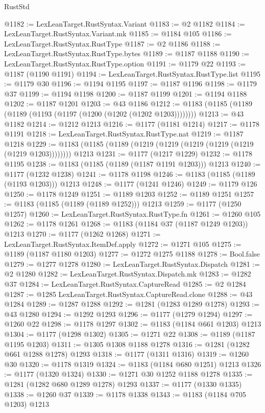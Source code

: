 \begin{lexlean}{RustStd}
\begin{coremodule}
@1182 := LexLeanTarget.RustSyntax.Variant
@1183 := @2 @1182
@1184 := LexLeanTarget.RustSyntax.Variant.mk
@1185 := @1184 @105
@1186 := LexLeanTarget.RustSyntax.RustType
@1187 := @2 @1186
@1188 := LexLeanTarget.RustSyntax.RustType.bytes
@1189 := @1187 @1188
@1190 := LexLeanTarget.RustSyntax.RustType.option
@1191 := @1179 @22
@1193 := @1187 (@1190 @1191)
@1194 := LexLeanTarget.RustSyntax.RustType.list
@1195 := @1179 @30
@1196 := @1194 @1195
@1197 := @1187 @1196
@1198 := @1179 @37
@1199 := @1194 @1198
@1200 := @1187 @1199
@1201 := @1194 @1188
@1202 := @1187 @1201
@1203 := @43 @1186
@1212 := @1183 (@1185 (@1189 (@1189 (@1193 (@1197 (@1200 (@1202 (@1202 @1203))))))))
@1213 := @43 @1182
@1214 := @1212 @1213
@1216 := @1177 (@1181 @1214)
@1217 := @1178 @1191
@1218 := LexLeanTarget.RustSyntax.RustType.nat
@1219 := @1187 @1218
@1229 := @1183 (@1185 (@1189 (@1219 (@1219 (@1219 (@1219 (@1219 (@1219 @1203)))))))) @1213
@1231 := @1177 (@1217 @1229)
@1232 := @1178 @1195
@1238 := @1183 (@1185 (@1189 (@1187 @1191 @1203))) @1213
@1240 := @1177 (@1232 @1238)
@1241 := @1178 @1198
@1246 := @1183 (@1185 (@1189 (@1193 @1203))) @1213
@1248 := @1177 (@1241 @1246)
@1249 := @1179 @126
@1250 := @1178 @1249
@1251 := @1189 @1203
@1252 := @1189 @1251
@1257 := @1183 (@1185 (@1189 (@1189 @1252))) @1213
@1259 := @1177 (@1250 @1257)
@1260 := LexLeanTarget.RustSyntax.RustType.fn
@1261 := @1260 @105
@1262 := @1178 @1261
@1268 := @1183 (@1184 @37 (@1187 @1249 @1203)) @1213
@1270 := @1177 (@1262 @1268)
@1271 := LexLeanTarget.RustSyntax.ItemDef.apply
@1272 := @1271 @105
@1275 := @1189 (@1187 @1180 @1203)
@1277 := @1272 @1275 @1188
@1278 := Bool.false
@1279 := @1277 @1278
@1280 := LexLeanTarget.RustSyntax.Dispatch
@1281 := @2 @1280
@1282 := LexLeanTarget.RustSyntax.Dispatch.mk
@1283 := @1282 @37
@1284 := LexLeanTarget.RustSyntax.CaptureRead
@1285 := @2 @1284
@1287 := @1285 LexLeanTarget.RustSyntax.CaptureRead.clone
@1288 := @43 @1284
@1289 := @1287 @1288
@1292 := @1281 (@1283 @1289 @1278)
@1293 := @43 @1280
@1294 := @1292 @1293
@1296 := @1177 (@1279 @1294)
@1297 := @1260 @22
@1298 := @1178 @1297
@1302 := @1183 (@1184 @661 @1203) @1213
@1304 := @1177 (@1298 @1302)
@1305 := @1271 @22
@1308 := @1189 (@1187 @1195 @1203)
@1311 := @1305 @1308 @1188 @1278
@1316 := @1281 (@1282 @661 @1288 @1278) @1293
@1318 := @1177 (@1311 @1316)
@1319 := @1260 @30
@1320 := @1178 @1319
@1324 := @1183 (@1184 @680 @1251) @1213
@1326 := @1177 (@1320 @1324)
@1330 := @1271 @30 @1252 @1188 @1278
@1335 := @1281 (@1282 @680 @1289 @1278) @1293
@1337 := @1177 (@1330 @1335)
@1338 := @1260 @37
@1339 := @1178 @1338
@1343 := @1183 (@1184 @705 @1203) @1213

\end{coremodule}
\end{lexlean}
